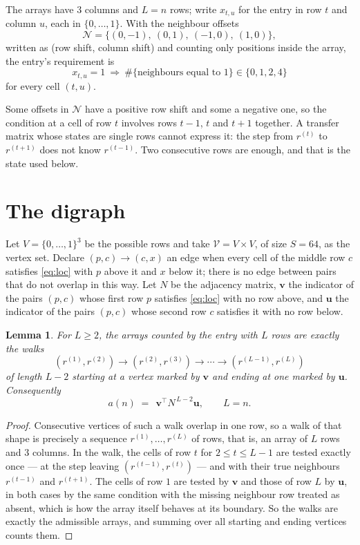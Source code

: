 \documentclass[11pt,a4paper]{article}
\theoremstyle{plain}
\newtheorem{lemma}[theorem]{Lemma}
\theoremstyle{definition}
\begin{document}
The arrays have $3$ columns and $L=n$ rows; write $x_{t,u}$ for the entry in
row $t$ and column $u$, each in $\{0,\dots,1\}$. With the neighbour offsets
\[
\mathcal N=\{(0,-1),\ (0,1),\ (-1,0),\ (1,0)\},
\]
written as (row shift, column shift) and counting only positions inside the array, the
entry's requirement is
\begin{equation}\label{eq:loc}
x_{t,u}=1\ \Rightarrow\ \#\{\text{neighbours equal to }1\}\in\{0,1,2,4\}
\end{equation}
for every cell $(t,u)$.

Some offsets in $\mathcal N$ have a positive row shift and some a negative one, so the
condition at a cell of row $t$ involves rows $t-1$, $t$ and $t+1$ together. A transfer
matrix whose states are single rows cannot express it: the step from $r^{(t)}$ to
$r^{(t+1)}$ does not know $r^{(t-1)}$. Two consecutive rows are enough, and that is
the state used below.

\section{The digraph}

Let $V=\{0,\dots,1\}^{3}$ be the possible rows and take
$\mathcal V=V\times V$, of size $S=64$, as the vertex set. Declare $(p,c)\to(c,x)$ an edge
when every cell of the middle row $c$ satisfies \eqref{eq:loc} with $p$ above it and $x$
below it; there is no edge between pairs that do not overlap in this way. Let $N$ be the
adjacency matrix, $\mathbf{v}$ the indicator of the pairs $(p,c)$ whose first row $p$
satisfies \eqref{eq:loc} with no row above, and $\mathbf{u}$ the indicator of
the pairs $(p,c)$ whose second row $c$ satisfies it with no row below.

\begin{lemma}\label{lem:walk}
For $L\ge2$, the arrays counted by the entry with $L$ rows are exactly the walks
\[
(r^{(1)},r^{(2)})\to(r^{(2)},r^{(3)})\to\cdots\to(r^{(L-1)},r^{(L)})
\]
of length $L-2$ starting at a vertex marked by $\mathbf{v}$ and ending at one marked by
$\mathbf{u}$. Consequently
\[
a(n)\;=\;\,\mathbf{v}^{\!\top}N^{\,L-2}\mathbf{u},\qquad L=n .
\]
\end{lemma}

\begin{proof}
Consecutive vertices of such a walk overlap in one row, so a walk of that shape is
precisely a sequence $r^{(1)},\dots,r^{(L)}$ of rows, that is, an array of $L$ rows
and $3$ columns. In the walk, the cells of row $t$ for $2\le t\le L-1$ are tested
exactly once --- at the step leaving $(r^{(t-1)},r^{(t)})$ --- and with their true
neighbours $r^{(t-1)}$ and $r^{(t+1)}$. The cells of row $1$ are tested by
$\mathbf{v}$ and those of row $L$ by $\mathbf{u}$, in both cases by the same condition
with the missing neighbour row treated as absent, which is how the array itself behaves at
its boundary. So the walks are exactly the admissible arrays, and summing over all starting
and ending vertices counts them.
\end{proof}
\end{document}
